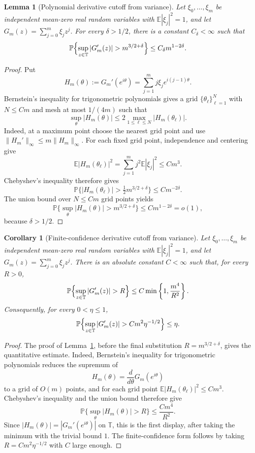 \documentclass[11pt]{amsart}
\numberwithin{equation}{section}
\newtheorem{corollary}[theorem]{Corollary}
\newtheorem{lemma}[theorem]{Lemma}
\theoremstyle{definition}
\theoremstyle{remark}
\newcommand{\T}{\mathbb T}
\newcommand{\Prob}{\mathbb P}
\newcommand{\Exp}{\mathbb E}
\begin{document}
\begin{lemma}[Polynomial derivative cutoff from variance]\label{lem:variance-speed}
Let \(\xi_0,\ldots,\xi_m\) be independent mean-zero real random variables with
\(\Exp|\xi_j|^2=1\), and let \(G_m(z)=\sum_{j=0}^m\xi_jz^j\). For every
\(\delta>1/2\), there is a constant \(C_\delta<\infty\) such that
\[
  \Prob\Bigl\{\sup_{z\in\T}|G_m'(z)|>m^{3/2+\delta}\Bigr\}
  \le C_\delta m^{1-2\delta}.
\]
\end{lemma}

\begin{proof}
Put
\[
  H_m(\theta):=G_m'(e^{i\theta})
  =\sum_{j=1}^m j\xi_j e^{i(j-1)\theta}.
\]
Bernstein's inequality for trigonometric polynomials gives a grid
\(\{\theta_\ell\}_{\ell=1}^N\) with \(N\le Cm\) and mesh at most \(1/(4m)\)
such that
\[
  \sup_\theta |H_m(\theta)|
  \le 2\max_{1\le\ell\le N}|H_m(\theta_\ell)|.
\]
Indeed, at a maximum point choose the nearest grid point and use
\(\|H_m'\|_\infty\le m\|H_m\|_\infty\).
For each fixed grid point, independence and centering give
\[
  \Exp |H_m(\theta_\ell)|^2
  =\sum_{j=1}^m j^2\Exp|\xi_j|^2
  \le C m^3 .
\]
Chebyshev's inequality therefore gives
\[
  \Prob\{|H_m(\theta_\ell)|>\tfrac12 m^{3/2+\delta}\}
  \le C m^{-2\delta}.
\]
The union bound over \(N\le Cm\) grid points yields
\[
  \Prob\{\sup_\theta |H_m(\theta)|>m^{3/2+\delta}\}
  \le C m^{1-2\delta}=o(1),
\]
because \(\delta>1/2\).
\end{proof}

\begin{corollary}[Finite-confidence derivative cutoff from variance]
\label{cor:variance-speed-confidence}
Let \(\xi_0,\ldots,\xi_m\) be independent mean-zero real random variables with
\(\Exp|\xi_j|^2=1\), and let \(G_m(z)=\sum_{j=0}^m\xi_jz^j\).  There is an
absolute constant \(C<\infty\) such that, for every \(R>0\),
\[
  \Prob\Bigl\{\sup_{z\in\T}|G_m'(z)|>R\Bigr\}
  \le C\min\left\{1,\frac{m^4}{R^2}\right\}.
\]
Consequently, for every \(0<\eta\le1\),
\[
  \Prob\Bigl\{\sup_{z\in\T}|G_m'(z)|
  > C m^2\eta^{-1/2}\Bigr\}\le \eta .
\]
\end{corollary}

\begin{proof}
The proof of Lemma~\ref{lem:variance-speed}, before the final substitution
\(R=m^{3/2+\delta}\), gives the quantitative estimate.  Indeed, Bernstein's
inequality for trigonometric polynomials reduces the supremum of
\[
  H_m(\theta)=\frac{d}{d\theta}G_m(e^{i\theta})
\]
to a grid of \(O(m)\) points, and for each grid point
\(\Exp |H_m(\theta_\ell)|^2\le Cm^3\).  Chebyshev's inequality and the union
bound therefore give
\[
  \Prob\{\sup_\theta |H_m(\theta)|>R\}
  \le \frac{Cm^4}{R^2}.
\]
Since \(|H_m(\theta)|=|G_m'(e^{i\theta})|\) on \(\T\), this is the first
display, after taking the minimum with the trivial bound \(1\).  The
finite-confidence form follows by taking \(R=Cm^2\eta^{-1/2}\) with \(C\)
large enough.
\end{proof}
\end{document}
